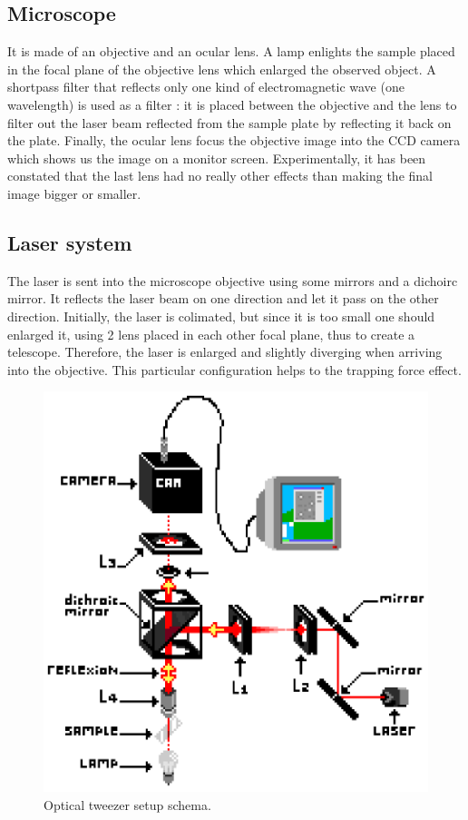 \documentclass[a4paper,12pt,twoside]{article}	%
\begin{document}
\subsection{Microscope}
It is made of an objective and an ocular lens. A lamp enlights the sample placed in the focal plane of the objective lens which enlarged the observed object. A shortpass filter that reflects only one kind of electromagnetic wave (one wavelength) is used as a filter : it is placed between the objective and the lens to filter out the laser beam reflected from the sample plate by reflecting it back on the plate. Finally, the ocular lens focus the objective image into the CCD camera which shows us the image on a monitor screen. Experimentally, it has been constated that the last lens had no really other effects than making the final image bigger or smaller.

\subsection{Laser system}
The laser is sent into the microscope objective using some mirrors and a dichoirc mirror. It reflects the laser beam on one direction and let it pass on the other direction.
Initially, the laser is colimated, but since it is too small one should enlarged it, using 2 lens placed in each other focal plane, thus to create a telescope. Therefore, the laser is enlarged and slightly diverging when arriving into the objective. This particular configuration helps to the trapping force effect.

\begin{figure}[h]
	\begin{center}
		\includegraphics[width=0.8\linewidth,angle=0]{./figures/montage_1}
		\caption{Optical tweezer setup schema.} \label{fig:dispositif}
	\end{center}
\end{figure}
\end{document}
